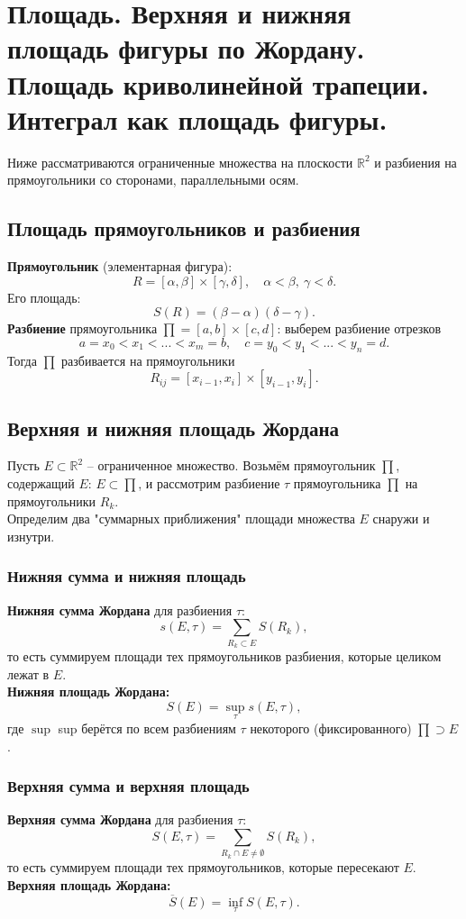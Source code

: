 \documentclass[14pt]{extreport}
\begin{document}
    \chapter{Площадь. Верхняя и нижняя площадь фигуры по Жордану. Площадь криволинейной трапеции. Интеграл как площадь фигуры.}

    Ниже рассматриваются ограниченные множества на плоскости $\mathbb{R}^2$ и разбиения на прямоугольники со сторонами, параллельными осям.

    \section{Площадь прямоугольников и разбиения}
    \textbf{Прямоугольник} (элементарная фигура):
    \[
    R = [\alpha, \beta] \times [\gamma, \delta], \quad \alpha<\beta,\ \gamma<\delta.
    \]
    Его площадь:
    \[
    S(R) = (\beta - \alpha)(\delta - \gamma).
    \]
    \textbf{Разбиение} прямоугольника $\prod = [a,b] \times [c,d]$: выберем разбиение отрезков
    \[
    a = x_0 < x_1 < ... < x_m = b, \quad c = y_0 < y_1 < ... < y_n = d.
    \]
    Тогда $\prod$ разбивается на прямоугольники
    \[
    R_{ij} = [x_{i-1}, x_i] \times [y_{i-1}, y_i].
    \]

    \section{Верхняя и нижняя площадь Жордана}
    Пусть $E \subset \mathbb{R}^2$ – ограниченное множество. Возьмём прямоугольник $\prod$, содержащий $E$: $E \subset \prod$, и рассмотрим разбиение $\tau$ прямоугольника $\prod$ на прямоугольники $R_k$.\\
    Определим два "суммарных приближения" площади множества $E$ снаружи и изнутри.

    \subsection{Нижняя сумма и нижняя площадь}
    \textbf{Нижняя сумма Жордана} для разбиения $\tau$:
    \[
    s(E,\tau) = \sum_{R_k \subset E} S(R_k),
    \]
    то есть суммируем площади тех прямоугольников разбиения, которые целиком лежат в $E$.\\
    \textbf{Нижняя площадь Жордана:}
    \[
    S(E) = \sup_\tau s(E,\tau),
    \]
    где $\sup$ sup берётся по всем разбиениям $\tau$ некоторого (фиксированного) $\prod \supset E$.

    \subsection{Верхняя сумма и верхняя площадь}
    \textbf{Верхняя сумма Жордана} для разбиения $\tau$:
    \[
    S(E,\tau) = \sum_{R_k \cap E \neq \emptyset} S(R_k),
    \]
    то есть суммируем площади тех прямоугольников, которые пересекают $E$.\\
    \textbf{Верхняя площадь Жордана:}
    \[
    \overline{S}(E) = \inf_\tau S(E,\tau).
    \]
\end{document}
